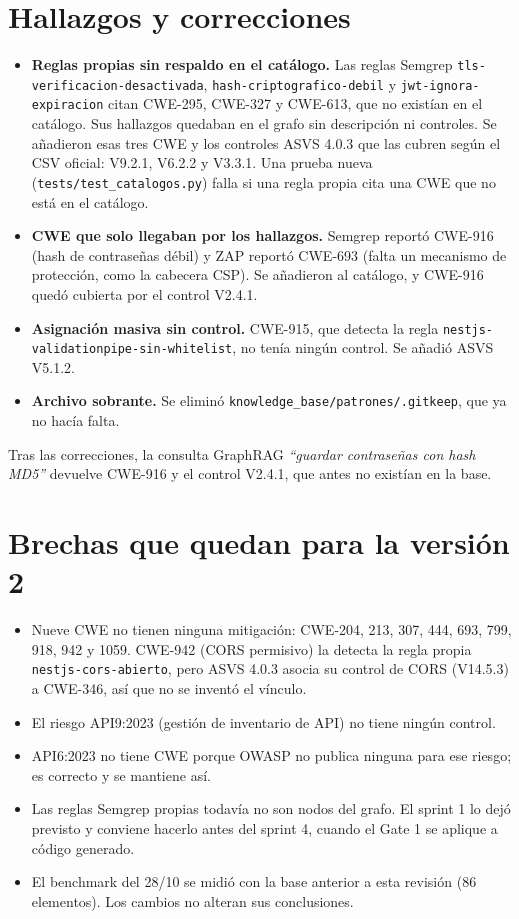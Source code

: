 \documentclass[11pt,a4paper]{report}
\begin{document}
\section{Hallazgos y correcciones}

\begin{itemize}
\item \textbf{Reglas propias sin respaldo en el catálogo.} Las reglas Semgrep
\texttt{tls-verificacion-desactivada}, \texttt{hash-criptografico-debil} y
\texttt{jwt-ignora-expiracion} citan CWE-295, CWE-327 y CWE-613, que no existían en el catálogo.
Sus hallazgos quedaban en el grafo sin descripción ni controles. Se añadieron esas tres CWE y los
controles ASVS 4.0.3 que las cubren según el CSV oficial: V9.2.1, V6.2.2 y V3.3.1. Una prueba
nueva (\texttt{tests/test\_catalogos.py}) falla si una regla propia cita una CWE que no está en el
catálogo.
\item \textbf{CWE que solo llegaban por los hallazgos.} Semgrep reportó CWE-916 (hash de
contraseñas débil) y ZAP reportó CWE-693 (falta un mecanismo de protección, como la cabecera CSP).
Se añadieron al catálogo, y CWE-916 quedó cubierta por el control V2.4.1.
\item \textbf{Asignación masiva sin control.} CWE-915, que detecta la regla
\texttt{nestjs-validationpipe-sin-whitelist}, no tenía ningún control. Se añadió ASVS V5.1.2.
\item \textbf{Archivo sobrante.} Se eliminó \texttt{knowledge\_base/patrones/.gitkeep}, que ya no
hacía falta.
\end{itemize}

Tras las correcciones, la consulta GraphRAG \emph{``guardar contraseñas con hash MD5''} devuelve
CWE-916 y el control V2.4.1, que antes no existían en la base.

\section{Brechas que quedan para la versión 2}

\begin{itemize}
\item Nueve CWE no tienen ninguna mitigación: CWE-204, 213, 307, 444, 693, 799, 918, 942 y 1059.
CWE-942 (CORS permisivo) la detecta la regla propia \texttt{nestjs-cors-abierto}, pero ASVS 4.0.3
asocia su control de CORS (V14.5.3) a CWE-346, así que no se inventó el vínculo.
\item El riesgo API9:2023 (gestión de inventario de API) no tiene ningún control.
\item API6:2023 no tiene CWE porque OWASP no publica ninguna para ese riesgo; es correcto y se
mantiene así.
\item Las reglas Semgrep propias todavía no son nodos del grafo. El sprint 1 lo dejó previsto y
conviene hacerlo antes del sprint 4, cuando el Gate 1 se aplique a código generado.
\item El benchmark del 28/10 se midió con la base anterior a esta revisión (86 elementos). Los
cambios no alteran sus conclusiones.
\end{itemize}
\end{document}
